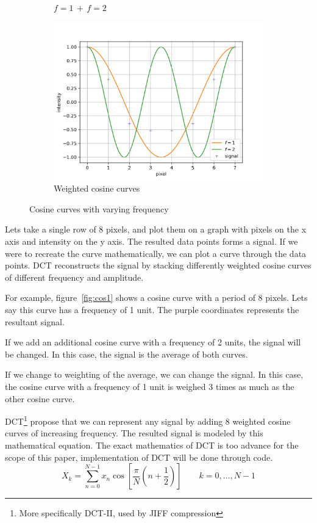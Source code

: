 \documentclass{article}
\begin{document}
\begin{figure}[h]
\begin{subfigure}[b]{0.45\textwidth}
	\caption{$f=1\, + \, f = 2$}
	\label{fig:cos2}
\end{subfigure}
\begin{subfigure}[b]{0.45\textwidth}
	\centering
	\includegraphics[width=\textwidth]{./figures/dct/cos3}
	\caption{Weighted cosine curves}
	\label{fig:cos3}
\end{subfigure}
\caption{Cosine curves with varying frequency}
\end{figure}

Lets take a single row of 8 pixels, and plot them on a graph with pixels on the x axis and intensity on the y axis.
The resulted data points forms a signal.
If we were to recreate the curve mathematically, we can plot a curve through the data points.
DCT reconstructs the signal by stacking differently weighted cosine curves of different frequency and amplitude.

For example, figure~\ref{fig:cos1} shows a cosine curve with a period of 8 pixels.
Lets say this curve has a frequency of 1 unit.
The purple coordinates represents the resultant signal.

If we add an additional cosine curve with a frequency of 2 units, the signal will be changed.
In this case, the signal is the average of both curves.

If we change to weighting of the average, we can change the signal.
In this case, the cosine curve with a frequency of 1 unit is weighed 3 times as much as the other cosine curve.

DCT\footnote{More specifically DCT-II, used by JIFF compression} propose that we can represent any signal by adding 8 weighted cosine curves of increasing frequency.
The resulted signal is modeled by this mathematical equation.
The exact mathematics of DCT is too advance for the scope of this paper, implementation of DCT will be done through code.
\begin{equation}
	X_k = \sum_{n=0}^{N-1} x_n \cos \left [ \frac{\pi}{N} \left ( n + \frac{1}{2} \right ) \right ] \qquad k = 0, \dots , N - 1
\end{equation}
\end{document}
